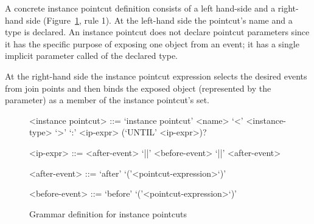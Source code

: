 A concrete instance pointcut definition consists of a left hand-side and a right-hand side (Figure~\ref{fig:grammar1}, rule 1). 
At the left-hand side the pointcut's name and a type is declared. 
An instance pointcut does not declare pointcut parameters since it has the specific purpose of exposing one object from an event; it has a single implicit parameter called  of the declared type. 

At the right-hand side the instance pointcut expression selects the desired events from join points and then binds the exposed object (represented by the  parameter) as a member of the instance pointcut's set. 

\begin{figure}[h!]
\begin{grammar}
<instance pointcut> ::= `instance pointcut' <name> `<' <instance-type> `>' `:'
<ip-expr> (`UNTIL' <ip-expr>)? 

<ip-expr> ::= <after-event> `||' <before-event>  `||' <after-event>  

<after-event> ::= `after' `('<pointcut-expression>`)'

<before-event> ::= `before' `('<pointcut-expression>`)'
\end{grammar}
\caption{Grammar definition for instance pointcuts}
\label{fig:grammar1}
\end{figure}


